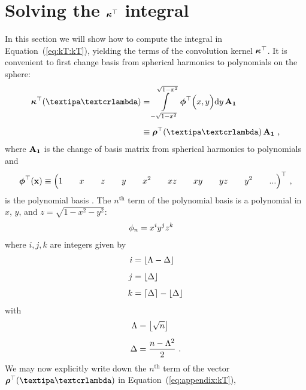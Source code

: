 \documentclass[modern]{aastex631}
\begin{document}
%
%
%
%
\clearpage
\appendix
%
%
%
%

\section{Solving the $\kT$ integral}
%
In this section we will show how to compute the integral in Equation~(\ref{eq:kT:kT}), yielding the terms of the convolution kernel $\kT$. 
It is convenient to first change basis from spherical harmonics to polynomials on the sphere:
%
\begin{align}
    \label{eq:appendix:kT}
    \kT(\lnlam)
     & =
    \int\limits_{-\sqrt{1 - x^2}}^
    {\sqrt{1 - x^2}}
    \pbasis
    \Big(x, y\Big)
    \mathrm{d}y
    \,
    \AOne
    \nonumber \\[0.5em]
     & \equiv
    \rhoT(\lnlam)
    \,
    \AOne
    \quad,
\end{align}
%
where $\AOne$ is the change of basis matrix from spherical harmonics to polynomials \citep[Equation B11 in][]{Luger2019} and
%
\begin{align}
    \pbasis(\x) \equiv
    \Big(
    1 \quad\quad\quad\quad\quad\quad x \quad\quad\quad\quad\quad\quad z \quad\quad\quad\quad\quad\quad y \quad\quad\quad\quad\quad\quad x^2 \quad\quad\quad\quad\quad\quad xz \quad\quad\quad\quad\quad\quad xy \quad\quad\quad\quad\quad\quad yz \quad\quad\quad\quad\quad\quad y^2 \quad\quad\quad\quad\quad\quad
    ...
    \Big)^\top
    \quad,
\end{align}
%
is the polynomial basis \citep[Equation 7][]{Luger2019}.
The $n^\mathrm{th}$ term of the polynomial basis is a polynomial in $x$, $y$, and $z = \sqrt{1 - x^2 - y^2}$:
%
\begin{align}
    \pbasisn
    &=
    x^i y^j z^k
\end{align}
%
where $i, j, k$ are integers given by
%
\begin{align}
    \label{eq:kT:lm}
    i &= \floor*{\Lambda - \Delta}
    \nonumber \\[0.5em]
    j &= \floor*{\Delta}
    \nonumber \\[0.5em]
    k &= \ceil*{\Delta} - \floor*{\Delta}
\end{align}
%
with
%
\begin{align}
    \Lambda &= \floor*{\sqrt{n}}
    \nonumber \\[0.5em]
    \Delta &= \frac{n - \Lambda^2}{2}
    \quad .
\end{align}
%
We may now explicitly write down the $n^\mathrm{th}$ term of the vector $\rhoT(\lnlam)$ in Equation~(\ref{eq:appendix:kT}),
\end{document}
